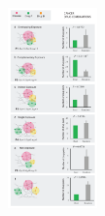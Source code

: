 \documentclass{beamer}
\begin{document}
\begin{frame}
\begin{figure}[!htb]
      \includegraphics[width=\linewidth, height=200]{figs/barabasi-cancer.png}
    \endminipage
  \end{figure}
\end{frame}
\end{document}
